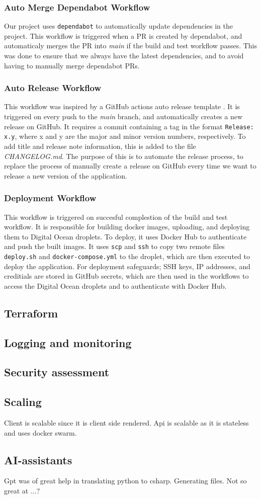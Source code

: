 \subsubsection{Auto Merge Dependabot Workflow}
Our project uses \texttt{dependabot} to automatically update dependencies in the project.
This workflow is triggered when a PR is created by dependabot, and automaticaly merges the PR into \textit{main} if the build and test workflow passes.
This was done to ensure that we always have the latest dependencies,
and to avoid having to manually merge dependabot PRs.
\subsubsection{Auto Release Workflow}
This workflow was inspired by a GitHub actions auto release template \cite{auto-release}.
It is triggered on every push to the \textit{main} branch, and automatically creates a new release on GitHub.
It requires a commit containing a tag in the format \texttt{Release: x.y}, where x and y are the major and minor version numbers, respectively.
To add title and release note information, this is added to the file \textit{CHANGELOG.md}.
The purpose of this is to automate the release process, to replace the process of manually create a release on GitHub every time 
we want to release a new version of the application.
\subsubsection{Deployment Workflow}
This workflow is triggered on succesful complestion of the build and test workflow.
It is responsible for building docker images, uploading, and deploying them to Digital Ocean droplets.
To deploy, it uses Docker Hub to authenticate and push the built images.
It uses \texttt{scp} and \texttt{ssh} to copy two remote files \texttt{deploy.sh} and \texttt{docker-compose.yml} to the droplet,
which are then executed to deploy the application.
For deployment safeguards; SSH keys, IP addresses, and creditials are stored in GitHub secrets,
which are then used in the workflows to access the Digital Ocean droplets and to authenticate with Docker Hub.

\subsection{Terraform}

\subsection{Logging and monitoring}

\subsection{Security assessment}

\subsection{Scaling}

Client is scalable since it is client side rendered.
Api is scalable as it is stateless and uses docker swarm.

\subsection{AI-assistants}

Gpt was of great help in translating python to csharp.
Generating files.
Not so great at ...?